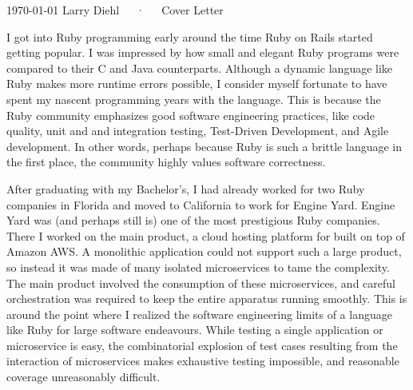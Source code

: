 \documentclass[11pt, a4paper]{awesome-cv}
\begin{document}
\makecvheader

\makecvfooter
  {\today}
  {Larry Diehl~~~·~~~Cover Letter}
  {}

\makelettertitle

\begin{cvletter}


I got into Ruby programming early around the time Ruby on Rails started getting popular.
I was impressed by how small and elegant Ruby programs were compared
to their C and Java counterparts. Although a dynamic language like
Ruby makes more runtime errors possible, I consider myself fortunate to have
spent my nascent programming years with the language. This is because
the Ruby community emphasizes good software engineering practices,
like code quality, unit and and integration testing, Test-Driven
Development, and Agile development. In other words, perhaps because
Ruby is such a brittle language in the first place, the community
highly values software correctness.

After graduating with my
Bachelor's, I had already worked for two Ruby companies in Florida and
moved to California to work for Engine Yard. Engine Yard was (and
perhaps still is) one of the most prestigious Ruby companies.
There I worked on the main product, a cloud hosting platform for built
on top of Amazon AWS. A monolithic application could not support such
a large product, so instead it was made of many isolated microservices
to tame the complexity. The main product involved the consumption of
these microservices, and careful orchestration was required to keep the
entire apparatus running smoothly. This is around the point where I
realized the software engineering limits of a language like
Ruby for large software endeavours. While testing a single application
or microservice is easy, the combinatorial explosion of test cases
resulting from the interaction of microservices makes exhaustive
testing impossible, and reasonable coverage unreasonably difficult.



\end{cvletter}
\end{document}
